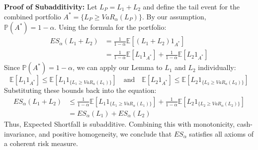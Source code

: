 \textbf{Proof of Subadditivity:}
Let $L_P = L_1 + L_2$ and define the tail event for the combined portfolio $A^* = \{L_P \ge VaR_{\alpha}(L_P)\}$.
By our assumption, $\mathbb{P}(A^*) = 1 - \alpha$.
Using the formula for the portfolio:
\begin{align*}
ES_{\alpha}(L_1 + L_2) &= \frac{1}{1-\alpha} \mathbb{E}[(L_1 + L_2) 1_{A^*}] \\
&= \frac{1}{1-\alpha} \mathbb{E}[L_1 1_{A^*}] + \frac{1}{1-\alpha} \mathbb{E}[L_2 1_{A^*}]
\end{align*}
Since $\mathbb{P}(A^*) = 1 - \alpha$, we can apply our Lemma to $L_1$ and $L_2$ individually:
\begin{equation*}
\mathbb{E}[L_1 1_{A^*}] \le \mathbb{E}[L_1 1_{\{L_1 \ge VaR_{\alpha}(L_1)\}}] \quad \text{and} \quad \mathbb{E}[L_2 1_{A^*}] \le \mathbb{E}[L_2 1_{\{L_2 \ge VaR_{\alpha}(L_2)\}}]
\end{equation*}
Substituting these bounds back into the equation:
\begin{align*}
ES_{\alpha}(L_1 + L_2) &\le \frac{1}{1-\alpha} \mathbb{E}[L_1 1_{\{L_1 \ge VaR_{\alpha}(L_1)\}}] + \frac{1}{1-\alpha} \mathbb{E}[L_2 1_{\{L_2 \ge VaR_{\alpha}(L_2)\}}] \\
&= ES_{\alpha}(L_1) + ES_{\alpha}(L_2)
\end{align*}
Thus, Expected Shortfall is subadditive. Combining this with monotonicity, cash-invariance, and positive homogeneity, we conclude that $ES_{\alpha}$ satisfies all axioms of a coherent risk measure.